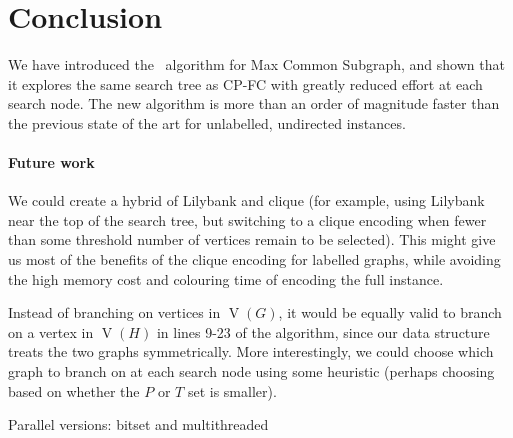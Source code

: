 \documentclass[letterpaper]{article}
\newcommand{\McSplit}{\textproc{McSplit}}
\DeclareMathOperator{\V}{V}
\begin{document}
\section{Conclusion}

We have introduced the \McSplit\ algorithm for Max Common Subgraph, and shown
that it explores the same search tree as CP-FC with greatly reduced effort at
each search node.  The new algorithm is more than an order of
magnitude faster than the previous state of the art for unlabelled, undirected
instances.

\paragraph{Future work} We could create a hybrid of Lilybank and clique (for
example, using Lilybank near the top of the search tree, but switching to a
clique encoding when fewer than some threshold number of vertices remain to be
selected). This might give us most of the benefits of the clique encoding for
labelled graphs, while avoiding the high memory cost and colouring time of
encoding the full instance.

Instead of branching on vertices in $\V(G)$, it would be equally valid to branch on
a vertex in $\V(H)$ in lines 9-23 of the algorithm, since our data structure treats the
two graphs symmetrically. More interestingly, we could choose which graph to branch on
at each search node using some heuristic (perhaps choosing based on whether the $P$ or
$T$ set is smaller).

Parallel versions: bitset and multithreaded



\end{document}
